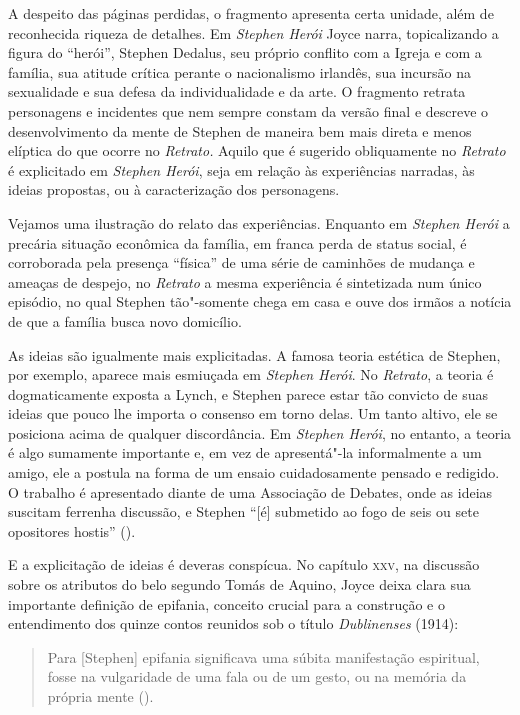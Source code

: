 A despeito das páginas perdidas, o fragmento apresenta certa unidade,
além de reconhecida riqueza de detalhes.  Em \textit{Stephen Herói}
Joyce narra, topicalizando a figura do “herói”, Stephen Dedalus, seu
próprio conflito com a Igreja e com a família, sua atitude crítica
perante o nacionalismo irlandês, sua incursão na sexualidade e sua
defesa da individualidade e da arte.  O fragmento
retrata personagens e incidentes que nem sempre constam da versão final
e descreve o desenvolvimento da mente de Stephen de maneira bem mais
direta e menos elíptica do que ocorre no \textit{Retrato.}  Aquilo
que é sugerido obliquamente no \textit{Retrato} é explicitado em
\textit{Stephen Herói}, seja em relação às experiências narradas, às
ideias propostas, ou à caracterização dos personagens.

Vejamos uma ilustração do relato das experiências.  Enquanto em
\textit{Stephen Herói} a precária situação econômica da família, em
franca perda de status social, é corroborada pela presença “física” de
uma série de caminhões de mudança e ameaças de despejo, no		
\textit{Retrato} a mesma experiência é sintetizada num único episódio,
no qual Stephen tão"-somente chega em casa e ouve dos irmãos a notícia
de que a família busca novo domicílio.

As ideias são igualmente mais explicitadas.  A famosa teoria
estética de Stephen, por exemplo, aparece mais esmiuçada em
\textit{Stephen Herói}.  No \textit{Retrato}, a teoria é dogmaticamente
exposta a Lynch, e Stephen parece estar tão convicto de suas ideias que
pouco lhe importa o consenso em torno delas.  Um tanto altivo,
ele se posiciona acima de qualquer discordância.  Em \textit{Stephen
Herói}, no entanto, a teoria é algo sumamente importante e, em vez de
apresentá"-la informalmente a um amigo, ele a postula na forma de um
ensaio cuidadosamente pensado e redigido.  O trabalho é apresentado
diante de uma Associação de Debates, onde as ideias suscitam ferrenha
discussão, e Stephen “[é] submetido ao fogo de seis ou sete opositores
hostis” (\pageref{refintro}).

E a explicitação de ideias é deveras conspícua.  No capítulo \textsc{xxv}, na
discussão sobre os atributos do belo segundo Tomás de Aquino, Joyce
deixa clara sua importante definição de epifania, conceito crucial para
a construção e o entendimento dos quinze contos reunidos sob o título
\textit{Dublinenses} (1914): 

\begin{quote}
Para [Stephen] epifania significava uma
súbita manifestação espiritual, fosse na vulgaridade de uma fala ou de
um gesto, ou na memória da própria mente (\pageref{refintro2}). 
\end{quote}
 
